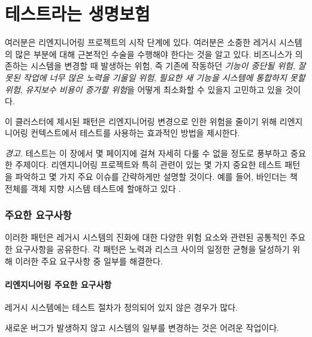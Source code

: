 \documentclass[a4paper,10pt,twoside]{book}
\begin{document}
	\renewcommand{\nnbb}[2]{} %
	\sloppy
\fi
\chapter{테스트라는 생명보험}

여러분은 리엔지니어링 프로젝트의 시작 단계에 있다. 여러분은 소중한 레거시 시스템의 많은 부분에 대해 근본적인 수술을 수행해야 한다는 것을 알고 있다. 비즈니스가 의존하는 시스템을 변경할 때 발생하는 위험, 즉 기존에 작동하던 \emph{기능이 중단될 위험}, \emph{잘못된 작업에 너무 많은 노력을 기울일 위험}, \emph{필요한 새 기능을 시스템에 통합하지 못할 위험}, \emph{유지보수 비용이 증가할 위험}을 어떻게 최소화할 수 있을지 고민하고 있을 것이다.

이 클러스터에 제시된 패턴은 리엔지니어링 변경으로 인한 위험을 줄이기 위해 리엔지니어링 컨텍스트에서 테스트를 사용하는 효과적인 방법을 제시한다.

\noindent
\emph{경고.}
테스트는 이 장에서 몇 페이지에 걸쳐 자세히 다룰 수 없을 정도로 풍부하고 중요한 주제이다. 리엔지니어링 프로젝트와 특히 관련이 있는 몇 가지 중요한 테스트 패턴을 파악하고 몇 가지 주요 이슈를 간략하게만 설명할 것이다. 예를 들어, 바인더는 책 전체를 객체 지향 시스템 테스트에 할애하고 있다 \cite{Bind99a}.

\subsection*{주요한 요구사항}

이러한 패턴은 레거시 시스템의 진화에 대한 다양한 위험 요소와 관련된 공통적인 주요한 요구사항을 공유한다. 각 패턴은 노력과 리스크 사이의 일정한 균형을 달성하기 위해 이러한 주요 요구사항 중 일부를 해결한다.

\subsubsection*{리엔지니어링 주요한 요구사항}

\begin{bulletlist}
\item 레거시 시스템에는 테스트 절차가 정의되어 있지 않은 경우가 많다.

\item 새로운 버그가 발생하지 않고 시스템의 일부를 변경하는 것은 어려운 작업이다.
\end{bulletlist}
\end{document}
